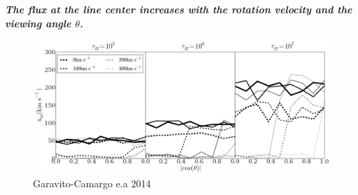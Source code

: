 \documentclass{beamer}
\begin{document}
\begin{frame}{\textit{\textbf{The flux at the line center increases with the rotation velocity and the viewing angle $\theta$.}}}
\begin{figure}
\includegraphics[scale=0.23]{Figures/f8.png}
\caption*{Garavito-Camargo e.a 2014}
\end{figure}
\end{frame}
\end{document}
